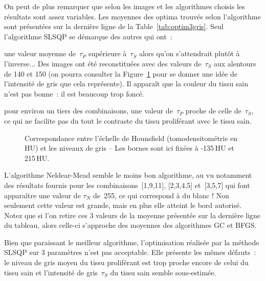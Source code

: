 \documentclass[main.tex]{subfiles}
\begin{document}
On peut de plus remarquer que selon les images et les algorithmes choisis les résultats sont assez variables. Les moyennes des optima trouvés selon l'algorithme sont présentées sur la dernière ligne de la Table~\ref{tab:optim3gris}. Seul l'algorithme SLSQP se démarque des autres qui ont~:
\begin{myitemize}
\item une valeur moyenne de~$\tau_P$ supérieure à~$\tau_S$ alors qu'on s'attendrait plutôt à l'inverse...  Des images ont été reconstituées avec des valeurs de~$\tau_S$ aux alentours de 140 et 150 (on pourra consulter la Figure~\ref{fig:schema_correspondance_gris} pour se donner une idée de l'intensité de gris que cela représente). Il apparaît que la couleur du tissu sain n'est pas bonne~: il est beaucoup trop foncé. 
\item pour environ un tiers des combinaisons, une valeur de~$\tau_P$ proche de celle de~$\tau_S$, ce qui ne facilite pas du tout le contraste du tissu proliférant avec le tissu sain.
\end{myitemize}

\begin{figure}[h]
\centering

\caption{\label{fig:schema_correspondance_gris} Correspondance entre l'échelle de Hounsfield (tomodensitométrie en HU) et les niveaux de gris -- Les bornes sont ici fixées à -135\,HU et 215\,HU.}
\end{figure}

L'algorithme Neldear-Mead semble le moins bon algorithme, au vu notamment des résultats fournis pour les combinaisons~[1,9,11], [2,3,4,5] et~[3,5,7] qui font apparaître une valeur de $\tau_N$ de~255, ce qui correspond à du blanc ! Non seulement cette valeur est grande, mais en plus elle atteint le bord autorisé. Notez que si l'on retire ces 3 valeurs de la moyenne présentée sur la dernière ligne du tableau, alors celle-ci s'approche des moyennes des algorithmes GC et BFGS. 

Bien que paraissant le meilleur algorithme, l'optimisation réalisée par la méthode SLSQP sur 3 paramètres n'est pas acceptable. Elle présente les mêmes défauts~: le niveau de gris moyen du tissu proliférant est trop proche encore de celui du tissu sain et l'intensité de gris~$\tau_S$  du tissu sain semble sous-estimée.
\end{document}
